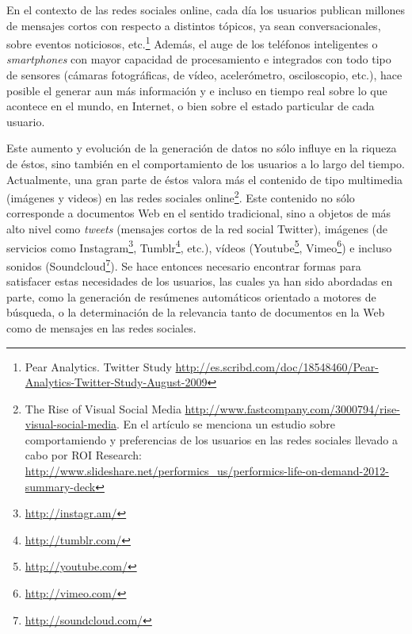    En el contexto de las redes sociales online, cada día los usuarios
   publican  millones de mensajes cortos con respecto a distintos
   tópicos, ya sean conversacionales, sobre eventos noticiosos,
   etc.\footnote{Pear Analytics. Twitter Study \href{http://es.scribd.com/doc/18548460/Pear-Analytics-Twitter-Study-August-2009}{http://es.scribd.com/doc/18548460/Pear-Analytics-Twitter-Study-August-2009} }
   Además, el auge de los teléfonos inteligentes o \emph{smartphones} con mayor
   capacidad de procesamiento e integrados con todo tipo de sensores
   (cámaras fotográficas, de vídeo, acelerómetro, osciloscopio, etc.),
   hace posible el generar aun más información y
   e incluso en tiempo real sobre lo que acontece en el mundo, en
   Internet, o bien sobre el estado particular de cada usuario.

   Este aumento y evolución de la generación de datos no sólo influye en la
   riqueza de éstos, sino también en el comportamiento de los usuarios
   a lo largo del tiempo. Actualmente,  una gran parte de éstos valora
   más el contenido de tipo multimedia (imágenes y videos)
   en las redes sociales online\footnote{The Rise of Visual Social Media \href{http://www.fastcompany.com/3000794/rise-visual-social-media}{http://www.fastcompany.com/3000794/rise-visual-social-media}. En el artículo se menciona un estudio sobre comportamiendo y preferencias de los usuarios en las redes sociales llevado a cabo por ROI Research: \href{http://www.slideshare.net/performics_us/performics-life-on-demand-2012-summary-deck}{http://www.slideshare.net/performics\_us/performics-life-on-demand-2012-summary-deck} }.
   Este contenido no sólo corresponde a documentos Web en el sentido
   tradicional, sino a objetos de más alto nivel como \emph{tweets}
   (mensajes cortos de la red social Twitter), imágenes (de servicios
   como Instagram\footnote{\href{http://instagr.am/}{http://instagr.am/} },
   Tumblr\footnote{\href{http://tumblr.com/}{http://tumblr.com/} }, etc.), vídeos
   (Youtube\footnote{\href{http://youtube.com/}{http://youtube.com/} }, Vimeo\footnote{\href{http://vimeo.com/}{http://vimeo.com/} }) e
   incluso sonidos (Soundcloud\footnote{\href{http://soundcloud.com/}{http://soundcloud.com/} }).
   Se hace entonces necesario encontrar formas para satisfacer estas
   necesidades de los usuarios, las cuales ya han sido
   abordadas en parte, como la generación de
   resúmenes automáticos orientado a motores de búsqueda, o la
   determinación de la relevancia tanto de documentos en la Web como de
   mensajes en las redes sociales.

